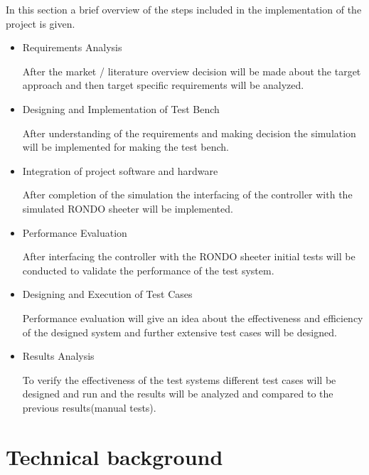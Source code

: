 \documentclass{listhesis}
\begin{document}
In this section a brief overview of the steps included in the implementation of the project is given. 
\begin{itemize}


\item{Requirements Analysis }

After the market / literature overview decision will be made about the target approach and then target specific requirements will be analyzed.

\item{Designing and Implementation of Test Bench }

After understanding of the requirements and making decision the simulation will be implemented for making the test bench.

\item{Integration of project software and hardware}

After completion of the simulation the interfacing of the controller with the simulated RONDO sheeter will be implemented. 

\item{Performance Evaluation}

After interfacing the controller with the RONDO sheeter initial tests will be conducted to validate the performance of the test system. 

\item{Designing and Execution of Test Cases}

Performance evaluation will give an idea about the effectiveness and efficiency of the designed system and further extensive test cases will be designed.

\item{Results Analysis}

To verify the effectiveness of the test systems different test cases will be designed and run and the results will be analyzed and compared to the previous results(manual tests).

\end{itemize}






\chapter{Technical background}
\end{document}
